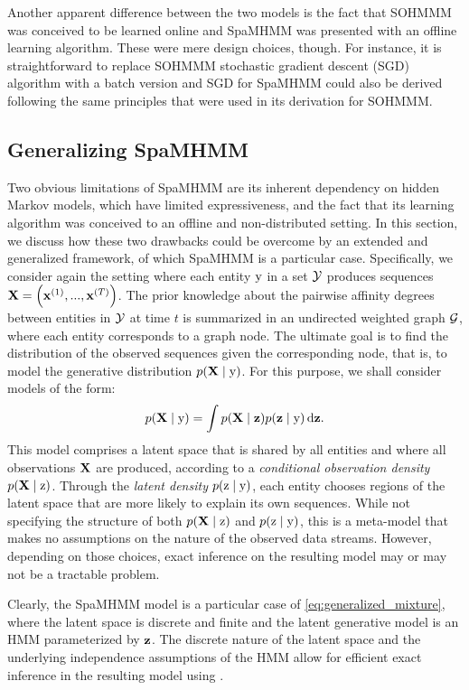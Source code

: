 Another apparent difference between the two models is the fact that SOHMMM was conceived to be learned online and SpaMHMM was presented with an offline learning algorithm. These were mere design choices, though. For instance, it is straightforward to replace SOHMMM stochastic gradient descent (SGD) algorithm with a batch version and SGD for SpaMHMM could also be derived following the same principles that were used in its derivation for SOHMMM.

\subsection{Generalizing SpaMHMM}
\label{sec:generalizing_spamhmm}

Two obvious limitations of SpaMHMM are its inherent dependency on hidden Markov models, which have limited expressiveness, and the fact that its learning algorithm was conceived to an offline and non-distributed setting. In this section, we discuss how these two drawbacks could be overcome by an extended and generalized framework, of which SpaMHMM is a particular case. Specifically, we consider again the setting where each entity ${\textnormal{y}}$ in a set ${\mathcal{Y}}$ produces sequences ${\mathbf{X}} = \left({\mathbf{x}}^{(1)}, ...,{\mathbf{x}}^{(T)} \right)$. The prior knowledge about the pairwise affinity degrees between entities in ${\mathcal{Y}}$ at time $t$ is summarized in an undirected weighted graph ${\mathcal{G}}$, where each entity corresponds to a graph node. The ultimate goal is to find the distribution of the observed sequences given the corresponding node, that is, to model the generative distribution $p({\mathbf{X}} \mid {\textnormal{y}})$. For this purpose, we shall consider models of the form:
\begin{equation}
    \label{eq:generalized_mixture}
    p({\mathbf{X}} \mid {\textnormal{y}}) = \int p({\mathbf{X}} \mid {\mathbf{z}}) p({\mathbf{z}} \mid {\textnormal{y}}) {\,\text{d}}{\mathbf{z}}.
\end{equation}
This model comprises a latent space that is shared by all entities and where all observations ${\mathbf{X}}$ are produced, according to a \textit{conditional observation density} $p({\mathbf{X}} \mid {\textnormal{z}})$. Through the \textit{latent density} $p({\textnormal{z}} \mid {\textnormal{y}})$, each entity chooses regions of the latent space that are more likely to explain its own sequences. While not specifying the structure of both $p({\mathbf{X}} \mid {\textnormal{z}})$ and $p({\textnormal{z}} \mid {\textnormal{y}})$, this is a meta-model that makes no assumptions on the nature of the observed data streams. However, depending on those choices, exact inference on the resulting model may or may not be a tractable problem.

Clearly, the SpaMHMM model is a particular case of \eqref{eq:generalized_mixture}, where the latent space is discrete and finite and the latent generative model is an HMM parameterized by ${\mathbf{z}}$. The discrete nature of the latent space and the underlying independence assumptions of the HMM allow for efficient exact inference in the resulting model using .

